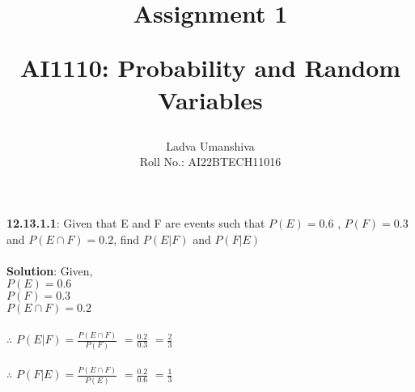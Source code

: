 \documentclass[12pt]{article}
\title{ \textbf{Assignment 1}  \\ \begin{normalsize} \textbf{AI1110}: Probability and Random Variables \end{normalsize}}
\author{Ladva Umanshiva \\ Roll No.: AI22BTECH11016}
\date{}
\begin{document}
\maketitle
\textbf{12.13.1.1}: Given that E and F are events such that $P(E) = 0.6$ , $P(F) = 0.3$ and $P(E \cap F) = 0.2$, find $P(E|F)$ and $P(F|E)$ \\\\
\textbf{Solution}: Given, 
			\\ \indent \indent \indent \indent \indent \indent $P(E) = 0.6$ \\ \indent \indent \indent \indent \indent \indent $P(F) = 0.3$ \\ \indent \indent \indent \indent \indent \indent $P(E \cap F) = 0.2$ \\\\
			$\therefore$			
			$ P(E|F) = \frac{P(E \cap F)}{P(F)} $ 
			$	 = \frac{0.2}{0.3} $ 
			$        = \frac{2}{3} $ \\\\
			$\therefore$
			$ P(F|E) = \frac{P(E \cap F)}{P(E)} $
			$        = \frac{0.2}{0.6} $
			$        = \frac{1}{3} $
\end{document}
